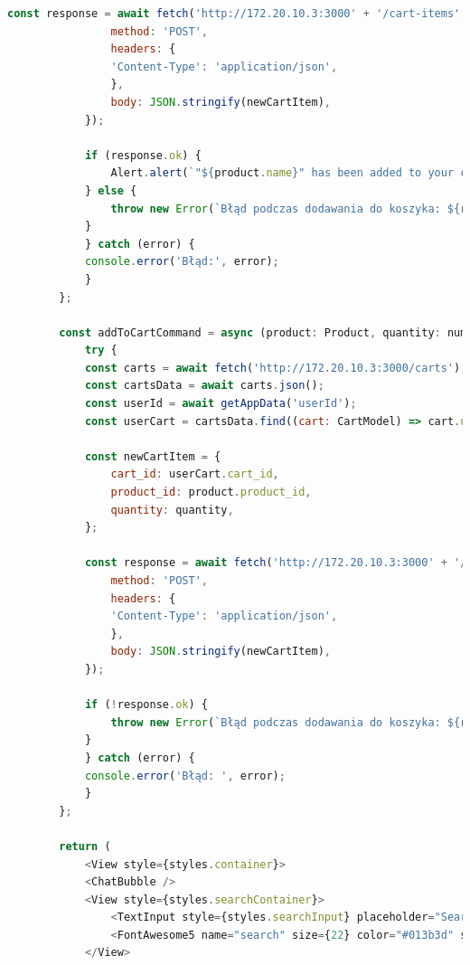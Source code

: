 \begin{lstlisting}[language=JavaScript, caption=Ekran produktów implementacja, label=lst:view]
            const response = await fetch('http://172.20.10.3:3000' + '/cart-items', {
                method: 'POST',
                headers: {
                'Content-Type': 'application/json',
                },
                body: JSON.stringify(newCartItem),
            });

            if (response.ok) {
                Alert.alert(`"${product.name}" has been added to your cart`);
            } else {
                throw new Error(`Błąd podczas dodawania do koszyka: ${response.statusText}`);
            }
            } catch (error) {
            console.error('Błąd:', error);
            }
        };

        const addToCartCommand = async (product: Product, quantity: number) => {
            try {
            const carts = await fetch('http://172.20.10.3:3000/carts');
            const cartsData = await carts.json();
            const userId = await getAppData('userId');
            const userCart = cartsData.find((cart: CartModel) => cart.user_id === userId);

            const newCartItem = {
                cart_id: userCart.cart_id,
                product_id: product.product_id,
                quantity: quantity,
            };

            const response = await fetch('http://172.20.10.3:3000' + '/cart-items', {
                method: 'POST',
                headers: {
                'Content-Type': 'application/json',
                },
                body: JSON.stringify(newCartItem),
            });

            if (!response.ok) {
                throw new Error(`Błąd podczas dodawania do koszyka: ${response.statusText}`);
            }
            } catch (error) {
            console.error('Błąd: ', error);
            }
        };

        return (
            <View style={styles.container}>
            <ChatBubble />
            <View style={styles.searchContainer}>
                <TextInput style={styles.searchInput} placeholder="Search products" value={searchQuery} onChangeText={handleSearch} selectionColor="#013b3d" />
                <FontAwesome5 name="search" size={22} color="#013b3d" style={styles.searchIcon} />
            </View>


\end{lstlisting}
